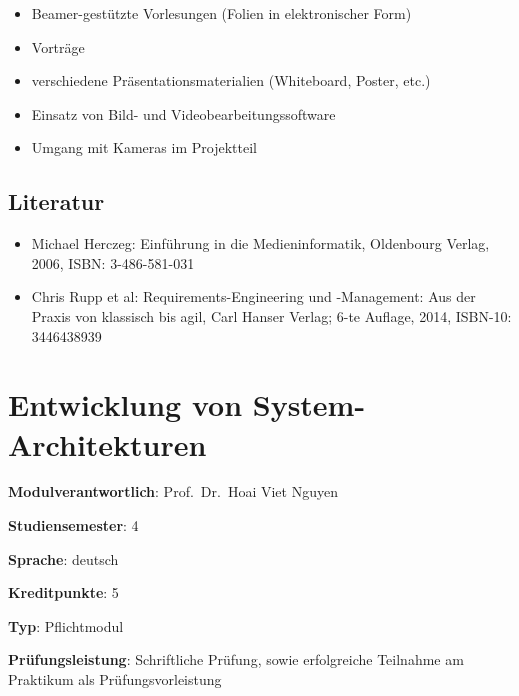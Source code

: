 \begin{itemize}
\tightlist
\item
  Beamer-gestützte Vorlesungen (Folien in elektronischer Form)
\item
  Vorträge
\item
  verschiedene Präsentationsmaterialien (Whiteboard, Poster, etc.)
\item
  Einsatz von Bild- und Videobearbeitungssoftware
\item
  Umgang mit Kameras im Projektteil
\end{itemize}

\hypertarget{literaturpathlabel....srcmodulbeschreibungen-bachelor-bpo5ba_einfhrungindiemedieninformatik}{%
\section*{Literatur\label{../../src/modulbeschreibungen-bachelor-bpo5/BA_EinfhrungindieMedieninformatik}}\label{literaturpathlabel....srcmodulbeschreibungen-bachelor-bpo5ba_einfhrungindiemedieninformatik}}

\begin{itemize}
\tightlist
\item
  Michael Herczeg: Einführung in die Medieninformatik, Oldenbourg
  Verlag, 2006, ISBN: 3-486-581-031
\item
  Chris Rupp et al: Requirements-Engineering und -Management: Aus der
  Praxis von klassisch bis agil, Carl Hanser Verlag; 6-te Auflage, 2014,
  ISBN-10: 3446438939
\end{itemize}

\hypertarget{entwicklung-von-system-architekturenpathlabel....srcmodulbeschreibungen-bachelor-bpo5ba_entwicklung-von-system-architekturen}{%
\chapter{Entwicklung von
System-Architekturen\label{../../src/modulbeschreibungen-bachelor-bpo5/BA_Entwicklung-von-System-Architekturen}}\label{entwicklung-von-system-architekturenpathlabel....srcmodulbeschreibungen-bachelor-bpo5ba_entwicklung-von-system-architekturen}}

\begin{modulHead}
\textbf{Modulverantwortlich}: Prof.~Dr.~Hoai Viet
Nguyen
\end{modulHead}
\begin{modulHead}
\textbf{Studiensemester}:
4
\end{modulHead}
\begin{modulHead}
\textbf{Sprache}:
deutsch
\end{modulHead}
\begin{modulHead}
\textbf{Kreditpunkte}:
5
\end{modulHead}
\begin{modulHead}
\textbf{Typ}:
Pflichtmodul
\end{modulHead}
\begin{modulHead}
\textbf{Prüfungsleistung}:
Schriftliche Prüfung, sowie erfolgreiche Teilnahme am Praktikum als
Prüfungsvorleistung
\end{modulHead}


